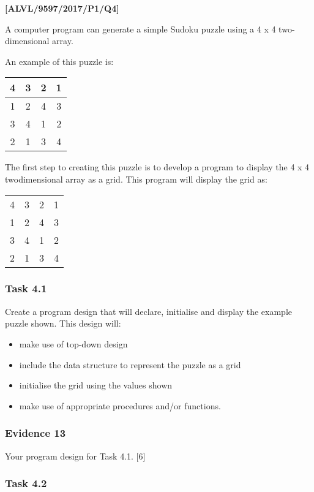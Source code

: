 \item \textbf{{[}ALVL/9597/2017/P1/Q4{]} }

A computer program can generate a simple Sudoku puzzle using a 4 x
4 two-dimensional array. 

An example of this puzzle is: 
\begin{center}
\begin{tabular}{|c|c|c|c|}
\hline 
4 & 3 & 2 & 1\tabularnewline
\hline 
1 & 2 & 4 & 3\tabularnewline
\hline 
3 & 4 & 1 & 2\tabularnewline
\hline 
2 & 1 & 3 & 4\tabularnewline
\hline 
\end{tabular}
\par\end{center}

The first step to creating this puzzle is to develop a program to
display the 4 x 4 twodimensional array as a grid. This program will
display the grid as: 
\begin{center}
\begin{tabular}{cccc}
4 & 3 & 2 & 1\tabularnewline
1 & 2 & 4 & 3\tabularnewline
3 & 4 & 1 & 2\tabularnewline
2 & 1 & 3 & 4\tabularnewline
\end{tabular}
\par\end{center}

\subsubsection*{Task 4.1}

Create a program design that will declare, initialise and display
the example puzzle shown. This design will: 
\begin{itemize}
\item make use of top-down design 
\item include the data structure to represent the puzzle as a grid 
\item initialise the grid using the values shown
\item make use of appropriate procedures and/or functions. 
\end{itemize}

\subsubsection*{Evidence 13}

Your program design for Task 4.1. \hfill{}{[}6{]}

\subsubsection*{Task 4.2}

